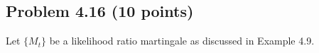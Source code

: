 \documentclass{article}
\begin{document}


\subsection*{Problem 4.16 (10 points)}
Let $\{M_t\}$ be a likelihood ratio martingale as discussed in Example 4.9.

%
\end{document}
